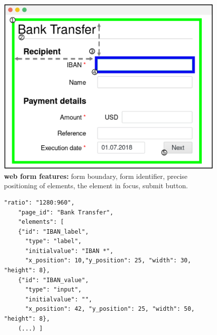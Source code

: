 \begin{figure}[t]
	\centering
\includegraphics[width=0.55\linewidth]{chapters/IntegriScreen/img/runningExample.png}
	\caption[\name{} web form features]{\textbf{\name{} web form features:} \one form boundary, \two form identifier, \three precise positioning of elements, \four the element in focus, \five submit button.
}
	\label{fig:runningExample}
\end{figure}

\begin{figure}[t]
\begin{lstlisting}[mathescape=true]
    "ratio": "1280:960",
    "page_id": "Bank Transfer",
    "elements": [
    {"id": "IBAN_label",
      "type": "label",
      "initialvalue": "IBAN *",
      "x_position": 10,"y_position": 25, "width": 30, "height": 8},
    {"id": "IBAN_value",
      "type": "input",
      "initialvalue": "",
      "x_position": 42, "y_position": 25, "width": 50, "height": 8},
    (...) ]
\end{lstlisting}
\end{figure}


